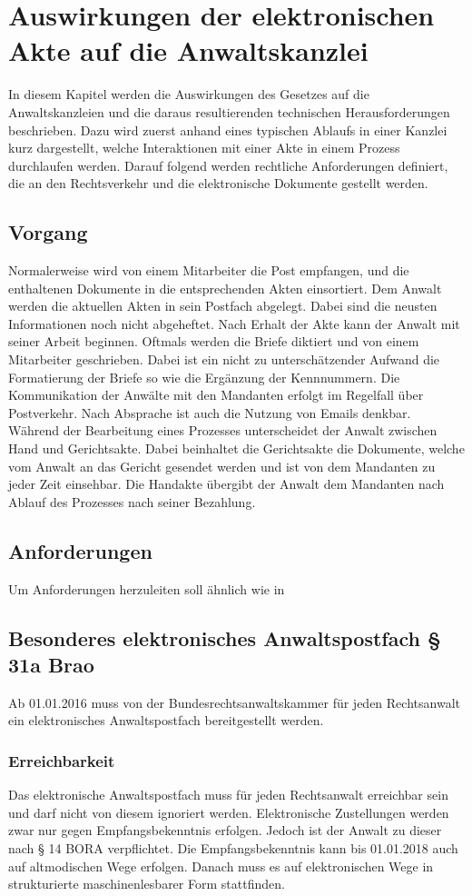 
\section{Auswirkungen der elektronischen Akte auf die Anwaltskanzlei}
In diesem Kapitel werden die Auswirkungen des Gesetzes auf die Anwaltskanzleien und die daraus resultierenden technischen Herausforderungen beschrieben. Dazu wird zuerst anhand eines typischen Ablaufs in einer Kanzlei kurz dargestellt, welche Interaktionen mit einer Akte in einem Prozess durchlaufen werden. Darauf folgend werden rechtliche Anforderungen definiert, die an den Rechtsverkehr und die elektronische Dokumente gestellt werden.
\subsection{Vorgang}
Normalerweise wird von einem Mitarbeiter die Post empfangen, und die enthaltenen Dokumente in die entsprechenden Akten einsortiert. Dem Anwalt werden die aktuellen Akten in sein Postfach abgelegt. Dabei sind die neusten Informationen noch nicht abgeheftet. Nach Erhalt der Akte kann der Anwalt mit seiner Arbeit beginnen. Oftmals werden die Briefe diktiert und von einem Mitarbeiter geschrieben. Dabei ist ein nicht zu unterschätzender Aufwand die Formatierung der Briefe so wie die Ergänzung der Kennnummern.
Die Kommunikation der Anwälte mit den Mandanten erfolgt im Regelfall über Postverkehr. Nach Absprache ist auch die Nutzung von Emails denkbar.
Während der Bearbeitung eines Prozesses unterscheidet der Anwalt zwischen Hand und Gerichtsakte. Dabei beinhaltet die Gerichtsakte die Dokumente, welche vom Anwalt an das Gericht gesendet werden und ist von dem Mandanten zu jeder Zeit einsehbar. Die Handakte übergibt der Anwalt dem Mandanten nach Ablauf des Prozesses nach seiner Bezahlung.
\subsection{Anforderungen}
Um Anforderungen herzuleiten soll ähnlich wie in \textcite{eakten-anforderungen}
	  

\subsection{Besonderes elektronisches Anwaltspostfach § 31a Brao}
Ab 01.01.2016 muss von der Bundesrechtsanwaltskammer für jeden Rechtsanwalt ein elektronisches Anwaltspostfach bereitgestellt werden.
\subsubsection*{Erreichbarkeit}
Das elektronische Anwaltspostfach muss für jeden Rechtsanwalt erreichbar sein und darf nicht von diesem ignoriert werden. Elektronische Zustellungen werden zwar nur gegen Empfangsbekenntnis erfolgen. Jedoch ist der Anwalt zu dieser nach § 14 BORA verpflichtet. Die Empfangsbekenntnis kann bis 01.01.2018 auch auf altmodischen Wege erfolgen. Danach muss es auf elektronischen Wege in strukturierte maschinenlesbarer Form stattfinden.
